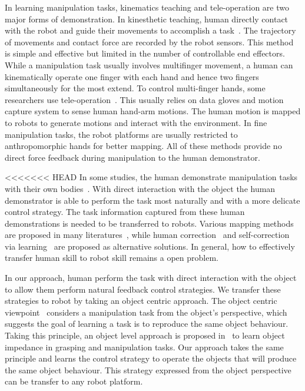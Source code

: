 In learning manipulation tasks, kinematics teaching and tele-operation are two major forms of demonstration. In kinesthetic teaching, human directly contact with the robot and guide their movements to accomplish a task~\cite{korkinof2013online,pais2014encoding,pastor2011skill,Miao2014}. The trajectory of movements and contact force are recorded by the robot sensors.
This method is simple and effective but limited in the number of controllable end effectors. While a manipulation task usually involves multifinger movement, a human can kinematically operate one finger with each hand and hence two fingers simultaneously for the most extend. To control multi-finger hands, some researchers use tele-operation~\cite{bernardino2013precision,kondo2008recognition,Fischer98}. This usually relies on data gloves and motion capture system to sense human hand-arm motions. The human motion is mapped to robots to generate motions and interact with the environment. In fine manipulation tasks, the robot platforms are usually restricted to anthropomorphic hands for better mapping. All of these methods provide no direct force feedback during manipulation to the human demonstrator.

<<<<<<< HEAD
In some studies, the human demonstrate manipulation tasks with their own bodies~\cite{asfour2008imitation}. With direct interaction with the object the human demonstrator is able to perform the task most naturally and with a more delicate control strategy. The task information captured from these human demonstrations is needed to be transferred to robots. Various mapping methods are proposed in many literatures~\cite{do2011towards,asfour2008imitation,hueser2006learning}, while human correction~\cite{calinon2007incremental,sauser2011iterative,romano2011human} and self-correction via learning~\cite{bidan2013robio} are proposed as alternative solutions. In general, how to effectively transfer human skill to robot skill remains a open problem.

In our approach, human perform the task with direct interaction with the object to allow them perform natural feedback control strategies. We transfer these strategies to robot by taking an object centric approach. The object centric viewpoint~\cite{okamura2000overview} considers a manipulation task from the object's perspective, which suggests the goal of learning a task is to reproduce the same object behaviour. Taking this principle, an object level approach is proposed in~\cite{Miao2014} to learn object impedance in grasping and manipulation tasks. Our approach takes the same principle and learns the control strategy to operate the objects that will produce the same object behaviour. This strategy expressed from the object perspective can be transfer to any robot platform.

